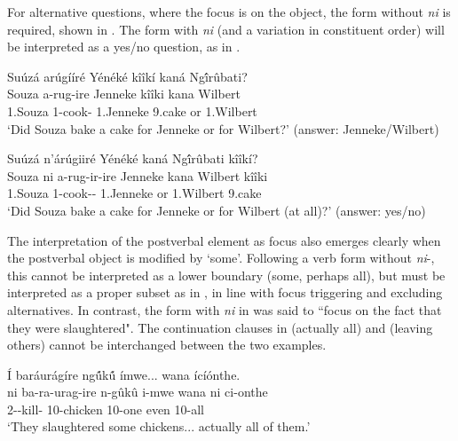 \documentclass[output=paper]{langscibook}
\begin{document}
\z
\z

For alternative questions, where the focus is on the object, the form without \textit{ni} is required, shown in . The form with \textit{ni} (and a variation in constituent order) will be interpreted as a yes/no question, as in .

\ea
\label{bkm:Ref125199864}
\ea
\label{bkm:Ref125199864:a}
Suúzá arúgííré Yénéké kîîkí kaná Ng\'{î}rûbati?\\
\gll
Souza  a-rug-ire  Jenneke  kîîki  kana  Wilbert\\
1.Souza 1\SM{}-cook-\PFV{} 1.Jenneke  9.cake  or  1.Wilbert\\
\glt
‘Did Souza bake a cake for Jenneke or for Wilbert?’ (answer: Jenneke/Wilbert)


\ex
\label{bkm:Ref125199864:b}
Suúzá n’árúgiiré Yénéké kaná Ng\'{î}rûbati kîîkí?\\
\gll
Souza  ni  a-rug-ir-ire  Jenneke  kana  Wilbert  kîîki\\
1.Souza \FOC{} 1\SM{}-cook-\APPL-\PFV{} 1.Jenneke  or  1.Wilbert  9.cake\\
\glt
‘Did Souza bake a cake for Jenneke or for Wilbert (at all)?’ (answer: yes/no)

\z
\z


The interpretation of the postverbal element as focus also emerges clearly when the postverbal object is modified by ‘some’. Following a verb form without \textit{ni}-, this cannot be interpreted as a lower boundary (some, perhaps all), but must be interpreted as a proper subset as in , in line with focus triggering and excluding alternatives. In contrast, the form with \textit{ni} in  was said to ``focus on the fact that they were slaughtered". The continuation clauses in  (actually all) and  (leaving others) cannot be interchanged between the two examples.

\ea
\label{bkm:Ref125199899}
\ea
\label{bkm:Ref125199899:a}
Í baráurágíre ng\'{û}k\'{û} ímwe... wana ícíónthe.\\
\gll
ni  ba-ra-urag-ire  n-gûkû  i-mwe  wana  ni  ci-onthe\\
\FOC{} 2\SM-\YPST{}-kill-\PFV{} 10-chicken  10-one  even \FOC{} 10-all\\
\glt
‘They slaughtered some chickens... actually all of them.’
\end{document}

